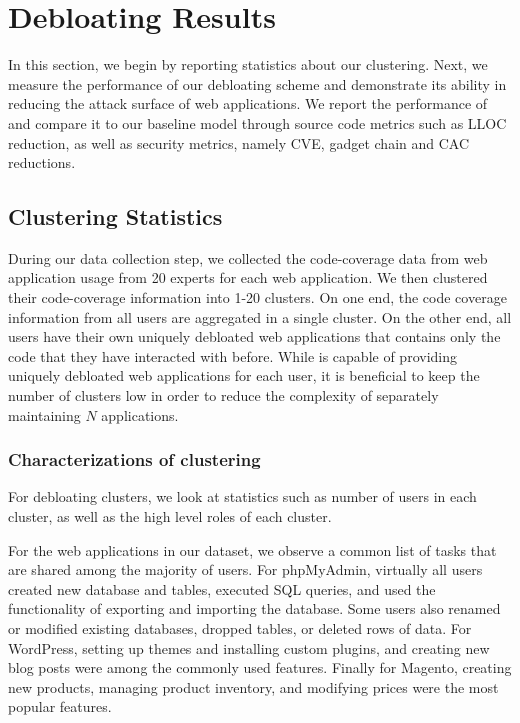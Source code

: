 \section{Debloating Results}
\label{sec:debloatingresults}

In this section, we begin by reporting statistics about our clustering. 
Next, we measure the performance of our debloating scheme and demonstrate its ability in reducing the attack surface of web applications. 
We report the performance of \sys{} and compare it to our baseline model through source code metrics such as LLOC reduction, as well as security metrics, namely CVE, gadget chain and CAC reductions. 

\subsection{Clustering Statistics}
During our data collection step, we collected the code-coverage data from web application usage from 20 experts for each web application.
We then clustered their code-coverage information into 1-20 clusters. 
On one end, the code coverage information from all users are aggregated in a single cluster. 
On the other end, all users have their own uniquely debloated web applications that contains only the code that they have interacted with before. 
While \sys{} is capable of providing uniquely debloated web applications for each user, it is beneficial to keep the number of clusters low in order to reduce the complexity of separately maintaining $N$ applications. 

\subsubsection{Characterizations of \sys{} clustering}
For \sys{} debloating clusters, we look at statistics such as number of users in each cluster, as well as the high level roles of each cluster. 

For the web applications in our dataset, we observe a common list of tasks that are shared among the majority of users. 
For phpMyAdmin, virtually all users created new database and tables, executed SQL queries, and used the functionality of exporting and importing the database.
Some users also renamed or modified existing databases, dropped tables, or deleted rows of data. 
For WordPress, setting up themes and installing custom plugins, and creating new blog posts were among the commonly used features. 
Finally for Magento, creating new products, managing product inventory, and modifying prices were the most popular features. 

